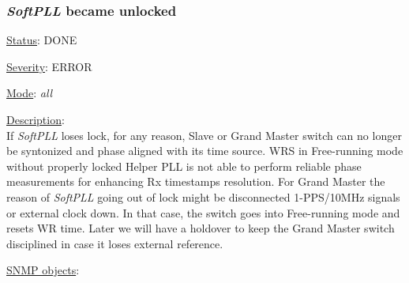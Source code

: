 \subsubsection{\bf \emph{SoftPLL} became unlocked}
		\label{fail:timing:spll_unlock}
		\begin{pck_descr}
			\item [] \underline{Status}: DONE
			\item [] \underline{Severity}: ERROR
			\item [] \underline{Mode}: \emph{all}
			\item [] \underline{Description}:\\
				If \emph{SoftPLL} loses lock, for any reason, Slave or Grand Master
				switch can no longer be syntonized and phase aligned with its time
				source. WRS in Free-running mode without properly locked Helper PLL is
				not able to perform reliable phase measurements for enhancing Rx
				timestamps resolution. For Grand Master the reason of \emph{SoftPLL}
				going out of lock might be disconnected 1-PPS/10MHz signals or external
				clock down. In that case, the switch goes into Free-running mode and
				resets WR time. Later we will have a holdover to keep the Grand Master
				switch disciplined in case it loses external reference.
			\item [] \underline{SNMP objects}:\\
				\\
				\\
				\\
				\\
				\\
				\\
				\\
				 \\
		\end{pck_descr}

